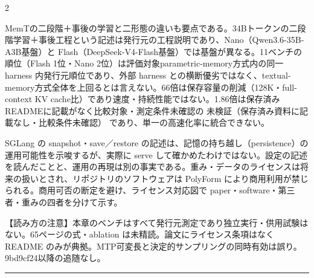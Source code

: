 \documentclass[lualatex,a4paper,10pt]{jlreq}
\begin{document}
\begin{multicols}{2} %


MemTの二段階＋事後の学習と二形態の違いも要点である。34Bトークンの二段階学習＋事後工程という記述は発行元の工程説明であり、Nano（Qwen3.6-35B-A3B基盤）と Flash（DeepSeek-V4-Flash基盤）では基盤が異なる。11ベンチの順位（Flash 1位・Nano 2位）は評価対象parametric-memory方式内の同一 harness 内発行元順位であり、外部 harness との横断優劣ではなく、textual-memory方式全体を上回るとは言えない。66倍は保存容量の削減（128K・full-context KV cache比）であり速度・持続性能ではない。1.86倍は保存済みREADMEに記載がなく比較対象・測定条件未確認の 未検証（保存済み資料に記載なし・比較条件未確認） であり、単一の高速化率に統合できない。


SGLang の snapshot・save／restore の記述は、記憶の持ち越し（persistence）の運用可能性を示唆するが、実際に serve して確かめたわけではない。設定の記述を読んだことと、運用の再現は別の事実である。重み・データのライセンスは将来の扱いとされ、リポジトリのソフトウェアは PolyForm により商用利用が禁じられる。商用可否の断定を避け、ライセンス対応図で paper・software・第三者・重みの四者を分けて示す。


\begin{tcolorbox}[colback=SurveySoft,colframe=SurveyRule,arc=1mm,boxrule=0.4pt,left=2mm,right=2mm]
【読み方の注意】本章のベンチはすべて発行元測定であり独立実行・供用試験はない。65ページの式・ablation は未精読。論文にライセンス条項はなく README のみが典拠。MTP可変長と決定的サンプリングの同時有効は誤り。9bd9cf24以降の追随なし。

\end{tcolorbox}


\end{multicols} %
\bigskip\hrule\bigskip %
\end{document}
